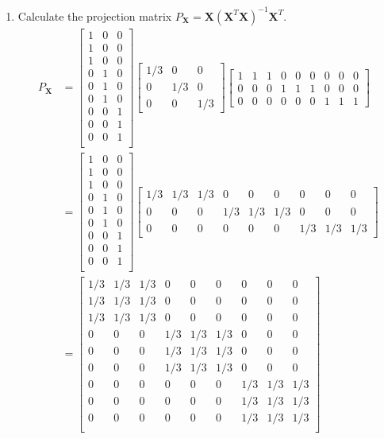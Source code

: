 \documentclass{article}
\begin{document}
\begin{enumerate}[leftmargin = 0 em, label = \arabic*., font = \bfseries]
\begin{enumerate}
		\item  Calculate the projection matrix $P_{\bm X} = \bm X (\bm X^T \bm X)^{-1} \bm X^T$.
		\begin{align*}
		P_{\bm X} &= 
		\begin{bmatrix}
			1&0&0\\
			1&0&0\\
			1&0&0\\
			0&1&0\\
			0&1&0\\
			0&1&0\\
			0&0&1\\
			0&0&1\\
			0&0&1\\
		\end{bmatrix}
		\begin{bmatrix}
			1/3 & 0 & 0\\
			0 & 1/3 & 0\\
			0 & 0& 1/3
		\end{bmatrix}
		\begin{bmatrix}
			1&1&1&0&0&0&0&0&0\\
			0&0&0&1&1&1&0&0&0\\
			0&0&0&0&0&0&1&1&1
		\end{bmatrix} 
		\\
		& = \begin{bmatrix}
			1&0&0\\
			1&0&0\\
			1&0&0\\
			0&1&0\\
			0&1&0\\
			0&1&0\\
			0&0&1\\
			0&0&1\\
			0&0&1\\
		\end{bmatrix}
		\begin{bmatrix}
			1/3 &1/3 &1/3&0&0&0&0&0&0\\
			0&0&0&1/3 &1/3 &1/3 &0&0&0\\
			0&0&0&0&0&0&1/3 &1/3 &1/3
		\end{bmatrix}
		\\
		&=\begin{bmatrix}
			1/3 &1/3 &1/3&0&0&0&0&0&0\\
			1/3 &1/3 &1/3&0&0&0&0&0&0\\
			1/3 &1/3 &1/3&0&0&0&0&0&0\\
			0&0&0&1/3 &1/3 &1/3 &0&0&0\\
			0&0&0&1/3 &1/3 &1/3 &0&0&0\\
			0&0&0&1/3 &1/3 &1/3 &0&0&0\\
			0&0&0&0&0&0&1/3 &1/3 &1/3\\
			0&0&0&0&0&0&1/3 &1/3 &1/3\\
			0&0&0&0&0&0&1/3 &1/3 &1/3\\
		\end{bmatrix}
		\end{align*}
	\end{enumerate}


\end{enumerate}
\end{document}
